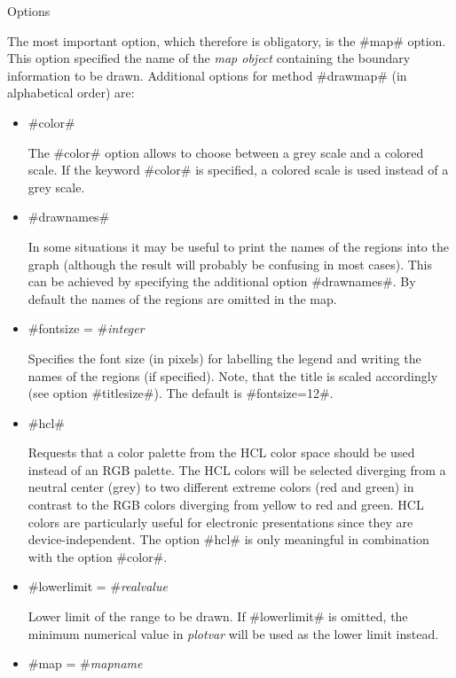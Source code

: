 \begin{stanza}{Options}

The most important option, which therefore is obligatory, is the
#map# option. This option specified the name of the {\em map
object} containing the boundary information to be drawn.
Additional options for method #drawmap# (in alphabetical order)
are:
\end{stanza}

\begin{itemize}
\item #color#

The #color# option allows to choose between a grey scale and a
colored scale. If the keyword #color# is specified, a colored
scale is used instead of a grey scale.

\item #drawnames#

In some situations it may be useful to print the names of the
regions into the graph (although the result will probably be
confusing in most cases). This can be achieved by specifying the
additional option #drawnames#. By default the names of the regions
are omitted in the map.

\item #fontsize = #{\em integer}

Specifies the font size (in pixels) for labelling the legend and
writing the names of the regions (if specified). Note, that the
title is scaled accordingly (see option #titlesize#). The default is
#fontsize=12#.

\item #hcl#

Requests that a color palette from the HCL color space should be
used instead of an RGB palette. The HCL colors will be selected
diverging from a neutral center (grey) to two different extreme
colors (red and green) in contrast to the RGB colors diverging
from yellow to red and green. HCL colors are particularly useful
for electronic presentations since they are device-independent.
The option #hcl# is only meaningful in combination with the option
#color#.

\item #lowerlimit = #{\em realvalue}

Lower limit of the range to be drawn. If #lowerlimit# is omitted,
the minimum numerical value in {\em plotvar} will be used as the
lower limit instead.

\item #map = #{\em mapname}


\end{itemize}
